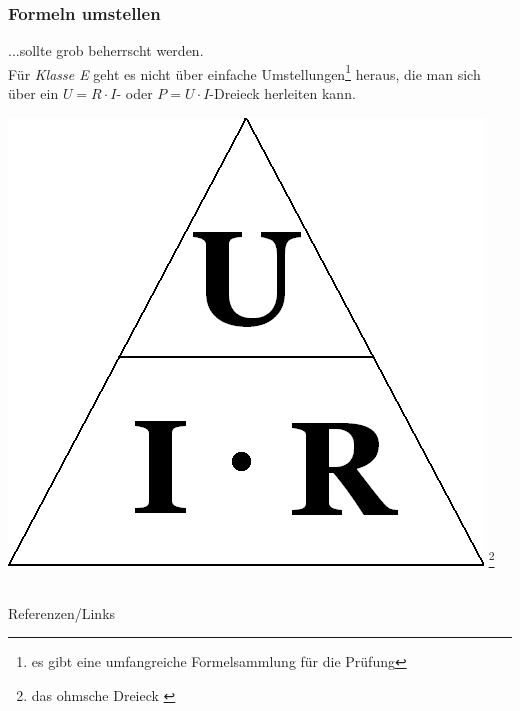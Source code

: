 \begin{frame}
    \frametitle{Formeln umstellen}

    ...sollte grob beherrscht werden. \\[2em]
    
    Für \emph{Klasse E} geht es nicht über einfache Umstellungen\footnote{es
    gibt eine umfangreiche Formelsammlung für die Prüfung} heraus, die man sich
    über ein $U = R\cdot I$- oder $P = U\cdot I$-Dreieck herleiten kann.

    \begin{center}
      \includegraphics[scale=0.25]{e01/Ohm_law_triangle.png}
      \footnote{das ohmsche Dreieck \cite{wmen}}
    \end{center}

\end{frame}

\renewcommand{\refname}{Referenzen}

\hypertarget{refs}{}
\textcolor{white}{} \\ %
\Large Referenzen/Links
\footnotesize

